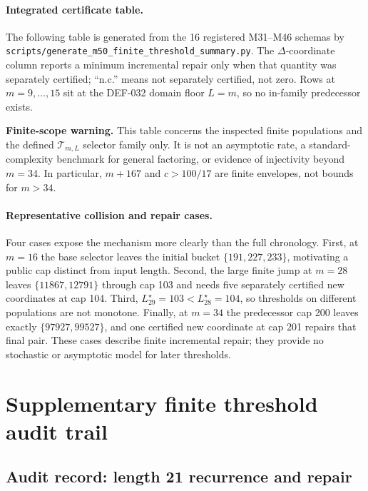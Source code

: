 \documentclass[11pt]{article}
\begin{document}
\paragraph{Integrated certificate table.}
The following table is generated from the 16 registered M31--M46 schemas by
\texttt{scripts/generate\_m50\_finite\_threshold\_summary.py}. The
\(\Delta\)-coordinate column reports a minimum incremental repair only when
that quantity was separately certified; ``n.c.'' means not separately
certified, not zero. Rows at \(m=9,\ldots,15\) sit at the DEF-032 domain floor
\(L=m\), so no in-family predecessor exists.



\noindent\textbf{Finite-scope warning.}
This table concerns the inspected finite populations and the defined
\(\mathcal T_{m,L}\) selector family only. It is not an asymptotic rate, a
standard-complexity benchmark for general factoring, or evidence of
injectivity beyond \(m=34\). In particular, \(m+167\) and
\(c>100/17\) are finite envelopes, not bounds for \(m>34\).

\paragraph{Representative collision and repair cases.}
Four cases expose the mechanism more clearly than the full chronology.
First, at \(m=16\) the base selector leaves the initial bucket
\(\{191,227,233\}\), motivating a public cap distinct from input length.
Second, the large finite jump at \(m=28\) leaves
\(\{11867,12791\}\) through cap 103 and needs five separately certified new
coordinates at cap 104. Third,
\(L_{29}^{\star}=103<L_{28}^{\star}=104\), so thresholds on different
populations are not monotone. Finally, at \(m=34\) the predecessor cap 200
leaves exactly \(\{97927,99527\}\), and one certified new coordinate at cap
201 repairs that final pair. These cases describe finite incremental repair;
they provide no stochastic or asymptotic model for later thresholds.

\section{Supplementary finite threshold audit trail}

\subsection{Audit record: length 21 recurrence and repair}
\end{document}
